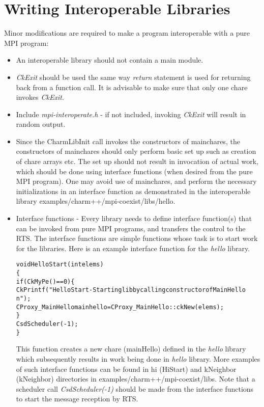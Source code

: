 \section{Writing Interoperable \charmpp{} Libraries}
Minor modifications are required to make a \charmpp{} program interoperable with a pure
MPI program:
\begin{itemize}
\item An interoperable \charmpp{} library should not contain a main module.
\item {\em CkExit} should be used the same way {\em return} statement is used for returning
back from a function call. It is advisable to make sure that only one chare
invokes {\em CkExit}.
\item Include {\em mpi-interoperate.h} - if not included, invoking {\em CkExit} will result 
in random output.
\item Since the CharmLibInit call invokes the constructors of mainchares, the
constructors of mainchares should only perform basic set up such as creation of chare
arrays etc. The set up should not result in invocation of actual work, which
should be done using interface functions (when desired from the pure MPI
program). One may avoid use of mainchares, and perform the necessary
initializations in an interface function as demonstrated in the interoperable
library examples/charm++/mpi-coexist/libs/hello.
\item Interface functions - Every library needs to define interface function(s) 
that can be invoked from pure MPI programs, and transfers the control to the 
\charmpp{} RTS. The interface functions are simple functions whose task is to
start work for the \charmpp{} libraries. Here is an example interface function for the
{\em hello} library. 
\begin{alltt}
  void HelloStart(int elems)
  \{
    if(CkMyPe() == 0) \{
      CkPrintf("HelloStart - Starting lib by calling constructor of MainHello\\n");
      CProxy\_MainHello mainhello = CProxy\_MainHello::ckNew(elems);
    \}
    CsdScheduler(-1);
  \}
\end{alltt}

This function creates a new chare (mainHello) defined in the {\em hello} library which
subsequently results in work being done in {\em hello} library.
More examples of such interface functions can 
be found in hi (HiStart) and kNeighbor (kNeighbor) directories in 
examples/charm++/mpi-coexist/libs. Note that a scheduler call {\em
CsdScheduler(-1)} should be made from the interface functions to start the
message reception by \charmpp{} RTS.
\end{itemize}

